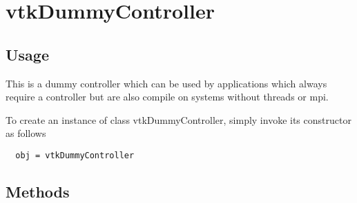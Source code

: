 \section{vtkDummyController}

\subsection{Usage}

 This is a dummy controller which can be used by applications which always
 require a controller but are also compile on systems without threads
 or mpi.

To create an instance of class vtkDummyController, simply
invoke its constructor as follows
\begin{verbatim}
  obj = vtkDummyController
\end{verbatim}
\subsection{Methods}


